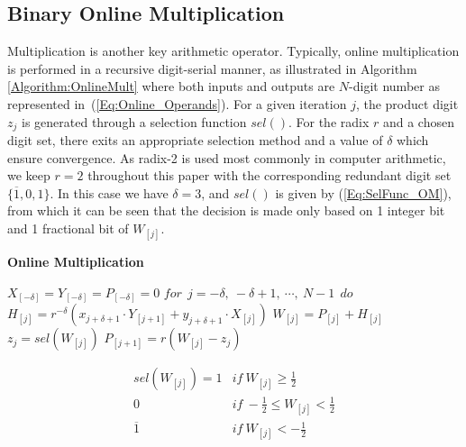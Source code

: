 \documentclass[journal]{IEEEtran}
\begin{document}
\subsection{Binary Online Multiplication}

Multiplication is another key arithmetic operator. Typically, online multiplication is performed in a recursive digit-serial manner, as illustrated in Algorithm \ref{Algorithm:OnlineMult} where both inputs and outputs are $N$-digit number as represented in~(\ref{Eq:Online_Operands}). For a given iteration $j$, the product digit $z_j$ is generated through a selection function $sel()$. For the radix $r$ and a chosen digit set, there exits an appropriate selection method and a value of $\delta$ which ensure convergence. As radix-2 is used most commonly in computer arithmetic, we keep $r=2$ throughout this paper with the corresponding redundant digit set $\{\overline{1},0,1\}$. In this case we have $\delta=3$, and $sel()$ is given by (\ref{Eq:SelFunc_OM}), from which it can be seen that the decision is made only based on 1 integer bit and 1 fractional bit of $W_{[j]}$.

\begin{algorithm}{\bf Online Multiplication} \label{Algorithm:OnlineMult}
  \begin{algorithmic}[1]
    $X_{[-\delta]}=Y_{[-\delta]}=P_{[-\delta]}=0$
     $for~~ j=-\delta,~-\delta+1,~\cdots,~N-1 ~~do$
     \label{Eq:OnlineMult_General}
\State  $    H_{[j]}  = r^{-\delta}\left(x_{j+\delta+1}\cdot Y_{[j+1]}+y_{j+\delta+1}\cdot X_{[j]}\right)$\label{Eq:OnlineMult_H}
      \State   $  W_{[j]}    = P_{[j]} + H_{[j]}$
     \State    $  z_j        =  sel(W_{[j]})$
    \State     $  P_{[j+1]}  =  r\left(W_{[j]}-z_j\right)$\label{Eq:OnlineMult_P}
  \end{algorithmic}
\end{algorithm}

\begin{equation}\label{Eq:SelFunc_OM}
\begin{array}{ll}
  sel(W_{[j]})=
    1 & if \ W_{[j]} \geq \frac{1}{2} \\
    0 &  if  \ -\frac{1}{2}\leq W_{[j]}<\frac{1}{2} \\
    \overline{1} & if \ W_{[j]}<-\frac{1}{2}
\end{array}
\end{equation}
\end{document}

